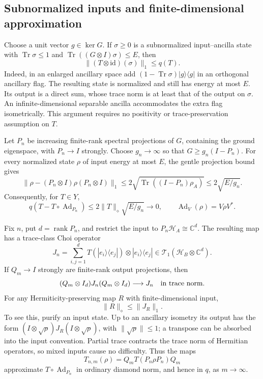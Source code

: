 \documentclass[11pt,a4paper]{article}
\theoremstyle{remark}
\begin{document}
\subsection{Subnormalized inputs and finite-dimensional approximation}

Choose a unit vector $g\in\ker G$. If $\sigma\ge0$ is a subnormalized
input--ancilla state with $\operatorname{Tr}\sigma\le1$ and
$\operatorname{Tr}((G\otimes I)\sigma)\le E$, then
\[
 \|(T\otimes\mathrm{id})(\sigma)\|_1\le q(T).
 \tag{928.1}\label{eq:928-substate}
\]
Indeed, in an enlarged ancillary space add
$(1-\operatorname{Tr}\sigma)|g\rangle\langle g|$ in an orthogonal ancillary
flag. The resulting state is normalized and still has energy at most $E$.
Its output is a direct sum, whose trace norm is at least that of the output
on $\sigma$. An infinite-dimensional separable ancilla accommodates the
extra flag isometrically. This argument requires no positivity or
trace-preservation assumption on $T$.

Let $P_n$ be increasing finite-rank spectral projections of $G$, containing
the ground eigenspace, with $P_n\to I$ strongly. Choose $g_n\to\infty$ so that
$G\ge g_n(I-P_n)$. For every normalized state $\rho$ of input energy at most
$E$, the gentle projection bound gives
\[
 \|\rho-(P_n\otimes I)\rho(P_n\otimes I)\|_1
 \le 2\sqrt{\operatorname{Tr}((I-P_n)\rho_A)}
 \le 2\sqrt{E/g_n}.
\]
Consequently, for $T\in Y$,
\[
 q(T-T\circ\operatorname{Ad}_{P_n})
 \le 2\|T\|_\diamond\sqrt{E/g_n}\longrightarrow0,
 \qquad \operatorname{Ad}_V(\rho)=V\rho V^*.
 \tag{928.2}\label{eq:928-input}
\]

Fix $n$, put $d=\operatorname{rank}P_n$, and restrict the input to $P_n\mathcal
H_A\cong\mathbb C^d$. The resulting map has a trace-class Choi operator
\[
 J_n=\sum_{i,j=1}^d T(|e_i\rangle\langle e_j|)
                  \otimes|e_i\rangle\langle e_j|
 \in\mathcal T_1(\mathcal H_B\otimes\mathbb C^d).
\]
If $Q_m\to I$ strongly are finite-rank output projections, then
\[
 (Q_m\otimes I_d)J_n(Q_m\otimes I_d)\longrightarrow J_n
 \quad\hbox{in trace norm}.
\]
For any Hermiticity-preserving map $R$ with finite-dimensional input,
\[
 \|R\|_\diamond\le\|J_R\|_1.
 \tag{928.3}\label{eq:928-choi}
\]
To see this, purify an input state. Up to an ancillary isometry its output
has the form $(I\otimes\sqrt{\rho})J_R(I\otimes\sqrt{\rho})$, with
$\|\sqrt{\rho}\|\le1$; a transpose can be absorbed into the input convention.
Partial trace contracts the trace norm of Hermitian operators, so mixed
inputs cause no difficulty. Thus the maps
\[
 T_{n,m}(\rho)=Q_mT(P_n\rho P_n)Q_m
\]
approximate $T\circ\operatorname{Ad}_{P_n}$ in ordinary diamond norm, and
hence in $q$, as $m\to\infty$.
\end{document}
